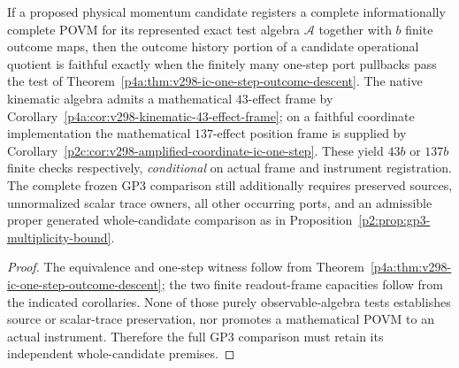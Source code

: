 \documentclass[11pt,a4paper]{article}
\begin{document}
\begin{corollary}
\label{p2f:cor:v298-ic-one-step-gp3-firewall}
If a proposed physical momentum candidate registers a complete
informationally complete POVM for its represented exact test algebra
$\mathcal A$ together with $b$ finite outcome maps, then the outcome
history portion of a candidate operational quotient is faithful exactly
when the finitely many one-step port pullbacks pass the test of
Theorem~\ref{p4a:thm:v298-ic-one-step-outcome-descent}.
The native kinematic algebra admits a mathematical $43$-effect frame by
Corollary~\ref{p4a:cor:v298-kinematic-43-effect-frame}; on a faithful
coordinate implementation the mathematical $137$-effect position frame
is supplied by
Corollary~\ref{p2c:cor:v298-amplified-coordinate-ic-one-step}.
These yield $43b$ or $137b$ finite checks respectively, \emph{conditional}
on actual frame and instrument registration. The complete frozen
GP3 comparison still additionally requires preserved sources,
unnormalized scalar trace owners, all other occurring ports, and an
admissible proper generated whole-candidate comparison as in
Proposition~\ref{p2:prop:gp3-multiplicity-bound}.
\end{corollary}
\begin{proof}
The equivalence and one-step witness follow from
Theorem~\ref{p4a:thm:v298-ic-one-step-outcome-descent}; the two finite
readout-frame capacities follow from the indicated corollaries.
None of those purely observable-algebra tests establishes source or
scalar-trace preservation, nor promotes a mathematical POVM to an actual
instrument. Therefore the full GP3 comparison must retain its independent
whole-candidate premises.
\end{proof}
\end{document}
